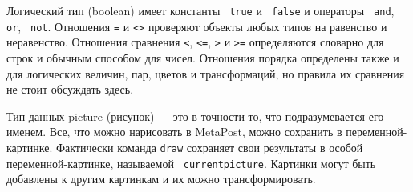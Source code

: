 \documentclass{article} %
\begin{document}
Логический тип (boolean) имеет константы {\tt
true}\label{Dtrue} и {\tt
false}\label{Dfalse} и операторы {\tt
and}\label{Dand}, {\tt
or}\label{Dor}, {\tt
not}\label{Dnot}.
Отношения \verb|=| и \verb|<>|\label{Dcmpar} 
проверяют объекты любых типов на равенство и неравенство.
Отношения сравнения  \verb|<|,
\verb|<=|, \verb|>| и 
\verb|>=| определяются словарно для строк и 
обычным способом для чисел.
Отношения порядка определены также и для логических величин, пар, цветов и 
трансформаций, но правила их сравнения не стоит обсуждать здесь.

Тип данных picture (рисунок) --- это в точности то, что 
подразумевается его именем.
Все, что можно нарисовать в MetaPost, можно сохранить в переменной-картинке.
Фактически команда {\tt draw} сохраняет свои 
результаты в особой переменной-картинке, называемой {\tt
currentpicture}. 
Картинки могут быть добавлены к другим картинкам и их можно трансформировать.
\end{document}
